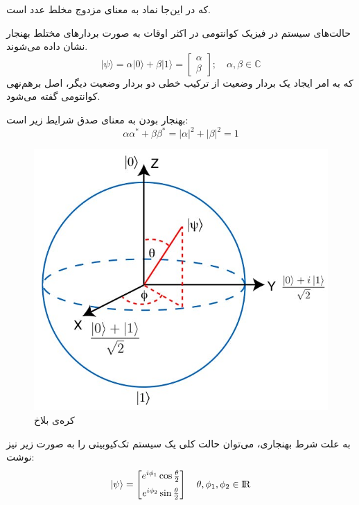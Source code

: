 که در این‌جا نماد \lr{$\alpha^*$}
به معنای مزدوج مخلط 
عدد \lr{$\alpha$}
است.
\newpage

حالت‌های سیستم در فیزیک کوانتومی در اکثر اوقات به صورت بردارهای مختلط بهنجار
نشان داده می‌شوند.
\begin{equation}
    |\psi\rangle = \alpha |0\rangle + \beta |1\rangle = \begin{bmatrix} \alpha \\ \beta \end{bmatrix} 
    ; \mspace{18mu}
    \alpha, \beta \in \mathbb{C}
\end{equation}
{}
که به امر ایجاد یک بردار وضعیت از ترکیب خطی دو بردار وضعیت دیگر، اصل برهم‌نهی کوانتومی
گفته می‌شود.

بهنجار بودن به معنای صدق شرایط زیر است:
\begin{equation}
    \alpha\alpha^* + \beta\beta^* = |\alpha|^2 + |\beta|^2 = 1
\end{equation}
\begin{figure}
	\centering
	\includegraphics[scale=0.4]{figures/bloch.jpg}
	\caption{کره‌ی بلاخ}
	\label{fig:bloch}
\end{figure}
به علت شرط بهنجاری، می‌توان حالت کلی یک سیستم تک‌کیوبیتی را به صورت زیر نیز نوشت:
\begin{equation}
|\psi\rangle = \begin{bmatrix} e^{i\phi_1}\cos{\tfrac{\theta}{2}} \\[6pt] e^{i\phi_2}\sin{\tfrac{\theta}{2}} \end{bmatrix} 
\mspace{18mu}
\theta, \phi_1, \phi_2 \in {\rm I\!R}
\end{equation}


